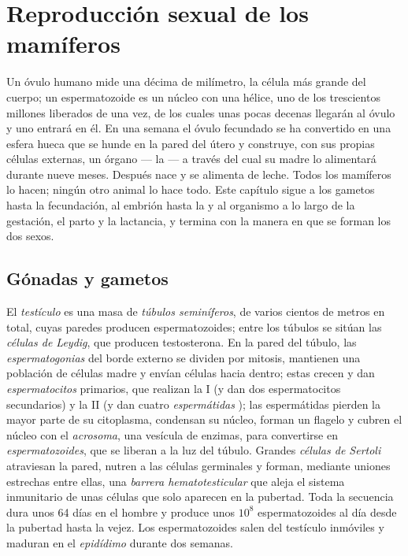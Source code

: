 \chapter{Reproducción sexual de los mamíferos}\label{ch:b2:mammal-reproduction}

Un óvulo humano mide una décima de milímetro, la célula más grande del
cuerpo; un espermatozoide es un núcleo con una hélice, uno de los
trescientos millones liberados de una vez, de los cuales unas pocas
decenas llegarán al óvulo y uno entrará en él. En una semana el óvulo
fecundado se ha convertido en una esfera hueca que se hunde en la pared
del útero y construye, con sus propias células externas, un órgano ---
la  --- a través del cual su madre lo alimentará durante nueve
meses. Después nace y se alimenta de leche. Todos los mamíferos lo
hacen; ningún otro animal lo hace todo. Este capítulo sigue a los gametos
hasta la fecundación, al embrión hasta la  y al organismo a
lo largo de la gestación, el parto y la lactancia, y termina con la
manera en que se forman los dos sexos.

\section{Gónadas y gametos}

\begin{definition}\label{def:b2:mammal-reproduction:testis}
El \emph{testículo} es una masa de \emph{túbulos seminíferos}, de varios
cientos de metros en total, cuyas paredes producen espermatozoides; entre
los túbulos se sitúan las \emph{células de Leydig}, que producen
testosterona. En la pared del túbulo, las \emph{espermatogonias} del
borde externo se dividen por mitosis, mantienen una población de células
madre y envían células hacia dentro; estas crecen y dan
\emph{espermatocitos} primarios, que realizan la  I (y dan dos
espermatocitos secundarios) y la  II (y dan cuatro
\emph{espermátidas} ); las espermátidas pierden la mayor parte
de su citoplasma, condensan su núcleo, forman un flagelo y cubren el
núcleo con el \emph{acrosoma}, una vesícula de enzimas, para convertirse
en \emph{espermatozoides}, que se liberan a la luz del túbulo. Grandes
\emph{células de Sertoli} atraviesan la pared, nutren a las células
germinales y forman, mediante uniones estrechas entre ellas, una
\emph{barrera hematotesticular} que aleja el sistema inmunitario de unas
células que solo aparecen en la pubertad. Toda la secuencia dura unos
\num{64} días en el hombre y produce unos $10^{8}$ espermatozoides al día
desde la pubertad hasta la vejez. Los espermatozoides salen del testículo
inmóviles y maduran en el \emph{epidídimo} durante dos semanas.
\end{definition}

